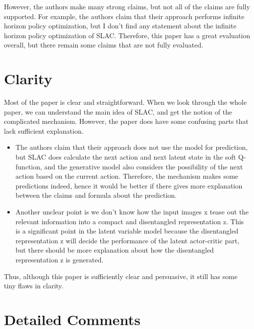 \documentclass[letterpaper]{article} %
\begin{document}
However, the authors make many strong claims, but not all of the claims are fully supported. For example, the authors claim that their approach performs infinite horizon policy optimization, but I don’t find any statement about the infinite horizon policy optimization of SLAC. Therefore, this paper has a great evaluation overall, but there remain some claims that are not fully evaluated.

\section{Clarity}

Most of the paper is clear and straightforward.  When we look through the whole paper, we can understand the main idea of SLAC, and get the notion of the complicated mechanism. However, the paper does have some confusing parts that lack sufficient explanation.
\begin{itemize}
    \item The authors claim that their approach does not use the model for prediction, but SLAC does calculate the next action and next latent state in the soft Q-function, and the generative model also considers the possibility of the next action based on the current action. Therefore, the mechanism makes some predictions indeed, hence it would be better if there gives more explanation between the claims and formula about the prediction.
    \item Another unclear point is we don’t know how the input images x tease out the relevant information into a compact and disentangled representation z. This is a significant point in the latent variable model because the disentangled representation z will decide the performance of the latent actor-critic part, but there should be more explanation about how the disentangled representation z is generated.
\end{itemize}

Thus, although this paper is sufficiently clear and persuasive, it still has some tiny flaws in clarity.

\section{Detailed Comments}
\end{document}
